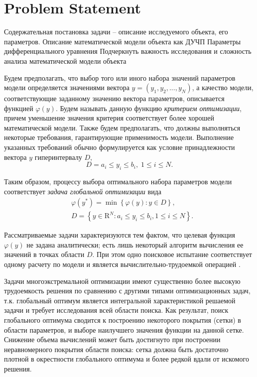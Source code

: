 \documentclass[sensors,article,submit,moreauthors,pdftex]{Definitions/mdpi}
\begin{document}
\section{Problem Statement}

Содержательная постановка задачи -- описание исследуемого объекта, его параметров. 
Описание математической модели объекта как ДУЧП
Параметры дифференциального уравнения
Подчеркнуть важность исследования и сложность анализа математической модели объекта


Будем предполагать, что выбор того или иного набора значений параметров модели определяется значениями вектора $y=(y_1,y_2,...,y_N)$, а качество модели, соответствующие заданному значению вектора параметров, описывается функцией $\varphi(y)$. Будем называть данную функцию \textit{критерием оптимизации}, причем уменьшение значения критерия соответствует более хорошей математической модели. Также будем предполагать, что должны выполняться некоторые требования, гарантирующие применимость модели. Выполнение указанных требований обычно формулируется как условие принадлежности вектора $y$ гиперинтервалу $D$,
\[
D={a_i \leq y_i \leq b_i, \; 1 \leq i \leq N}.
\]

Таким образом, процессу выбора оптимального набора параметров модели соответствует \textit{задача глобальной оптимизации} вида
\begin{eqnarray}\label{main_problem}
& \varphi(y^\ast)=\min{\left\{\varphi(y):y\in D\right\}},\\
& D=\left\{y\in \text{R}^N: a_i\leq y_i \leq b_i, 1\leq i \leq N\right\}. \nonumber
\end{eqnarray}

Рассматриваемые задачи характеризуются тем фактом, что целевая функция $\varphi(y)$ не задана аналитически; есть лишь некоторый алгоритм вычисления ее значений в точках области $D$. При этом одно поисковое испытание соответствует одному расчету по модели и является вычислительно-трудоемкой операцией \cite{Kalyulin2017,Paulavicius2020}.

Задачи многоэкстремальной оптимизации имеют существенно более высокую трудоемкость решения по сравнению с другими типами оптимизационных задач, т.к. глобальный оптимум является интегральной характеристикой решаемой задачи и требует исследования всей области поиска. Как результат, поиск глобального оптимума сводится к построению некоторого покрытия (сетки) в области параметров, и выборе наилучшего значения функции на данной сетке. Снижение объема вычислений может быть достигнуто при построении неравномерного покрытия области поиска: сетка должна быть достаточно плотной в окрестности глобального оптимума и более редкой вдали от искомого решения.
\end{document}
